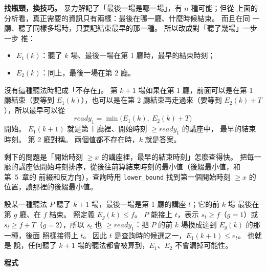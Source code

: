 \textbf{找瓶頸，換技巧。} 暴力解記了「最後一場是哪一場」，有 $n$ 種可能；但從
上面的分析看，真正需要的資訊只有兩樣：最後在哪一廳、什麼時候結束。 而且在同
一廳、聽了同樣多場時，只要記結束最早的那一種。 所以改成對「聽了幾場」一步一步
推：

\begin{itemize}
\item $E_1(k)$：聽了 $k$ 場、最後一場在第 1 廳時，最早的結束時刻；
\item $E_2(k)$：同上，最後一場在第 2 廳。
\end{itemize}

沒有這種聽法時記成「不存在」。 第 $k + 1$ 場如果在第 1 廳，前面可以是在第 1
廳結束（要等到 $E_1(k)$），也可以是在第 2 廳結束再走過來（要等到
$E_2(k) + T$），所以最早可以從
\[
\mathit{ready}_1 = \min\bigl(E_1(k),\ E_2(k) + T\bigr)
\]
開始。 $E_1(k + 1)$ 就是第 1 廳裡、開始時刻 $\ge \mathit{ready}_1$ 的講座中，
最早的結束時刻。 第 2 廳對稱。 兩個值都不存在時，$k$ 就是答案。

剩下的問題是「開始時刻 $\ge x$ 的講座裡，最早的結束時刻」怎麼查得快。 把每一
廳的講座依開始時刻排序，從後往前算結束時刻的最小值（後綴最小值，和第~5~章的
前綴和反方向），查詢時用 \texttt{lower\_bound} 找到第一個開始時刻 $\ge x$ 的
位置，讀那裡的後綴最小值。

\begin{whybox}[只記最早的結束時刻就夠]
設某一種聽法 $P$ 聽了 $k + 1$ 場，最後一場是第 1 廳的講座 $t$；它的前 $k$ 場
最後在第 $g$ 廳、在 $f$ 結束。 照定義 $E_g(k) \le f$。 $P$ 能接上 $t$，表示
$s_t \ge f$（$g = 1$）或 $s_t \ge f + T$（$g = 2$），所以 $s_t$ 也
$\ge \mathit{ready}_1$：把 $P$ 的前 $k$ 場換成達到 $E_g(k)$ 的那一種，後面
照樣接得上 $t$。 因此 $t$ 是查詢時的候選之一，$E_1(k + 1) \le e_t$。 也就是
說，任何聽了 $k + 1$ 場的聽法都會被算到，$E_1$、$E_2$ 不會漏掉可能性。
\end{whybox}

\textbf{程式}

